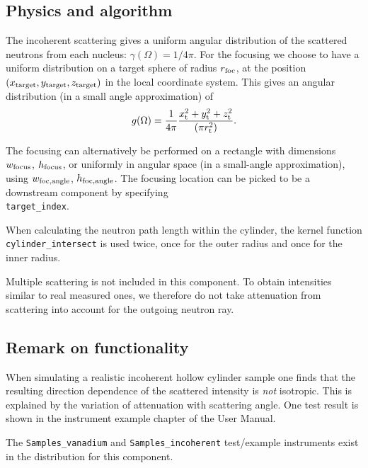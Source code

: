 \subsection{Physics and algorithm}

The incoherent scattering gives
a uniform angular distribution of the scattered
neutrons from each nucleus: $\gamma(\Omega) = 1/4\pi$.
For the focusing we choose to have a uniform distribution on
a target sphere of radius $r_{\rm foc}$, at the position
$(x_{\rm target},y_{\rm target},z_{\rm target})$
in the local coordinate system.
This gives an angular distribution (in a small angle approximation)
of
\begin{equation}
g(\Omega) = \frac{1}{4\pi}
  \frac{x_{\rm t}^2+y_{\rm t}^2+z_{\rm t}^2}{(\pi r_{\rm t}^2)}.
\end{equation}

The focusing can alternatively be performed on a rectangle with dimensions
$w_{\rm focus}$, $h_{\rm focus}$, or uniformly in angular space
(in a small-angle approximation),
using $w_{\rm foc, angle}$, $h_{\rm foc, angle}$.
The focusing location can be picked to be a downstream component by
specifying \\
\verb+target_index+.

When calculating the neutron path length within
the cylinder, the kernel function \\
\verb+cylinder_intersect+
is used twice, once for the outer radius and once
for the inner radius.

Multiple scattering is not included in this component. To obtain
intensities similar to real measured ones, we therefore do not
take attenuation from scattering into account for the outgoing
neutron ray.

\subsection{Remark on functionality}
When simulating a realistic incoherent hollow cylinder sample
one finds that  the resulting direction dependence
of the scattered intensity is {\em not} isotropic.
This is explained by the variation of attenuation with
scattering angle.
One test result is shown in the instrument example chapter of the \MCS User Manual.

The \verb+Samples_vanadium+ and \verb+Samples_incoherent+ test/example instruments exist in the distribution for this component.

